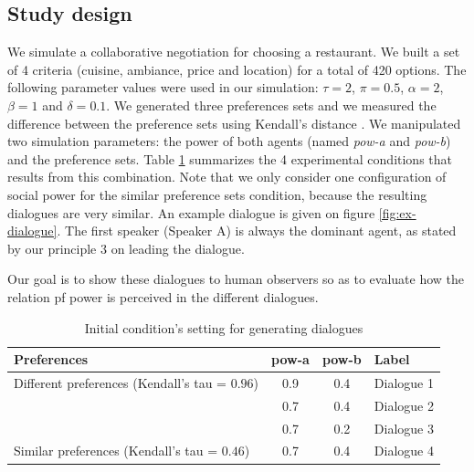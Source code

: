 \documentclass{llncs}
\begin{document}
	\subsection{Study design}
	We simulate a collaborative negotiation for choosing a restaurant. We built a set of 4 criteria (cuisine, ambiance, price and location) for a total of 420 options. The following parameter values were used in our simulation: $\tau=2$, $\pi=0.5$, $\alpha=2$, $\beta=1$ and $\delta=0.1$. We generated three preferences sets and we measured the difference between the preference sets using Kendall's distance \cite{bra2013Kendall}. We manipulated two simulation parameters: the power of both agents (named \emph{pow-a} and \emph{pow-b}) and the preference sets. Table \ref{table:conditions} summarizes the 4 experimental conditions that results from this combination. Note that we only consider one configuration of social power for the similar preference sets condition, because the resulting dialogues are very similar. An example dialogue is given on figure \ref{fig:ex-dialogue}. The first speaker (Speaker A) is always the dominant agent, as stated by our principle 3 on leading the dialogue.
	
	Our goal is to show these dialogues to human observers so as to evaluate how the relation pf power is perceived in the different dialogues.
	\begin{table}
		\centering
		\begin{tabular}{ |l|c|c|l| }
			\hline
			\textbf{Preferences}& \textbf{pow-a} & \textbf{pow-b} & \textbf{Label} \\ 
			\hline
			\newline\multirow{3}{*} {Different preferences (Kendall's tau = $0.96$)} & 0.9 & 0.4 & Dialogue 1 \\ \cline{2-4}
			
			\newline  & 0.7 & 0.4 & Dialogue 2\\ \cline{2-4}
			
			\newline   &0.7 & 0.2 & Dialogue 3\\ 
			\hline
			\newline Similar preferences (Kendall's tau = $0.46$) & 0.7 & 0.4 & Dialogue 4\\
			\hline
		\end{tabular}
		\caption{Initial condition's setting for generating dialogues} 
		\label{table:conditions}
	\end{table}
	
\end{document}

